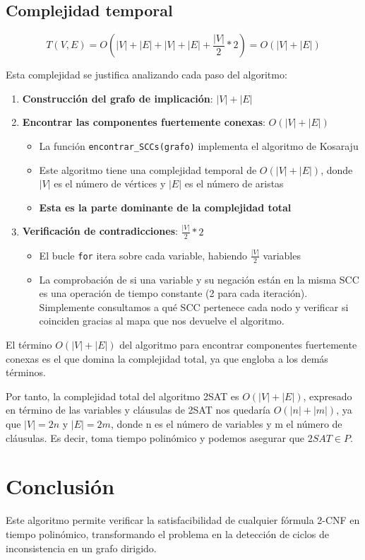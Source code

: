 \documentclass[a4paper,12pt]{article}
\begin{document}
\subsection*{Complejidad temporal}

\begin{equation*}
	T(V, E) = O(|V| + |E| +|V| + |E| + \frac{|V|}{2} * 2) = O(|V| + |E|)
\end{equation*}

Esta complejidad se justifica analizando cada paso del algoritmo:

\begin{enumerate}
	\item \textbf{Construcción del grafo de implicación}: $|V| + |E|$
    \item \textbf{Encontrar las componentes fuertemente conexas}: $O(|V| + |E|)$
    \begin{itemize}
        \item La función \texttt{encontrar\_SCCs(grafo)} implementa el algoritmo de Kosaraju
        \item Este algoritmo tiene una complejidad temporal de $O(|V| + |E|)$, donde $|V|$ es el número de vértices y $|E|$ es el número de aristas
        \item \textbf{Esta es la parte dominante de la complejidad total}
    \end{itemize}
    
    \item \textbf{Verificación de contradicciones}: $\frac{|V|}{2} * 2$
    \begin{itemize}
        \item El bucle \texttt{for} itera sobre cada variable, habiendo $\frac{|V|}{2}$ variables
        \item La comprobación de si una variable y su negación están en la misma SCC es una operación de tiempo constante (2 para cada iteración). Simplemente consultamos a qué SCC pertenece cada nodo y verificar si coinciden gracias al mapa que nos devuelve el algoritmo.
    \end{itemize}
\end{enumerate}

El término $O(|V| + |E|)$ del algoritmo para encontrar componentes fuertemente conexas es el que domina la complejidad total, ya que engloba a los demás términos.

Por tanto, la complejidad total del algoritmo 2SAT es $O(|V| + |E|)$, expresado en término de las variables y cláusulas de 2SAT nos quedaría $O(|n| + |m|)$, ya que $|V| = 2n$ y $|E| = 2m$, donde n es el número de variables y m el número de cláusulas. Es decir, toma tiempo polinómico y podemos asegurar que $2SAT \in P$.

\section{Conclusión}

Este algoritmo permite verificar la satisfacibilidad de cualquier fórmula 2-CNF en tiempo polinómico, transformando el problema en la detección de ciclos de inconsistencia en un grafo dirigido.
\end{document}

